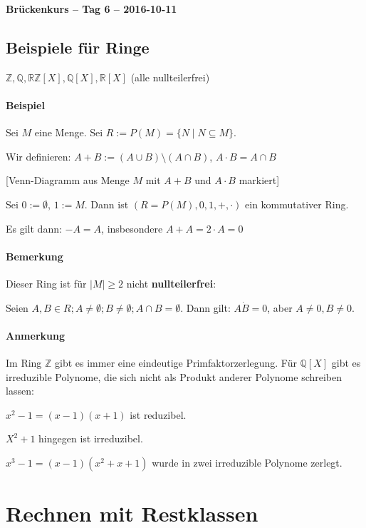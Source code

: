 \documentclass[14pt,a4paper]{article}
\newcommand{\Z}{\ensuremath{\mathbb{Z}}}
\newcommand{\Q}{\ensuremath{\mathbb{Q}}}
\begin{document}
	\begin{center}
		\Huge\textbf{Brückenkurs – Tag 6 – 2016-10-11}
	\end{center}
	\par

  \setcounter{section}{7}
  \setcounter{subsection}{3}
  \subsection{Beispiele für Ringe}
  $\Z, \Q, \mathbb{R} \Z[X], \Q[X], \mathbb{R}[X]$ (alle nullteilerfrei)

  \paragraph{Beispiel}
  Sei $M$ eine Menge. Sei $R := P(M) = \{ N \; | \; N \subseteq M\}$.

  Wir definieren: $A + B := ( A \cup B) \setminus (A \cap B)$, $A \cdot B = A
  \cap B$

  [Venn-Diagramm aus Menge $M$ mit $A+B$ und $A \cdot B$ markiert]

  Sei $ 0 := \emptyset $, $ 1 := M $.
  Dann ist $ ( R= P(M), 0, 1, +, \cdot ) $ ein kommutativer Ring.

  Es gilt dann: $ -A = A $, insbesondere $ A + A = 2 \cdot A = 0 $

  \paragraph{Bemerkung}
  Dieser Ring ist für $ |M| \geq 2 $ nicht \textbf{nullteilerfrei}:

  Seien $ A,B \in R ; A \neq \emptyset ; B \neq \emptyset ; A \cap B = \emptyset
  $.
  Dann gilt: $ A \dot B = 0$, aber $A \neq 0, B \neq 0$.

  \paragraph{Anmerkung}
  Im Ring $\Z$ gibt es immer eine eindeutige Primfaktorzerlegung.
  Für $ \Q[X] $ gibt es irreduzible Polynome, die sich nicht als Produkt anderer
  Polynome schreiben lassen:

  $ x^2 - 1 = (x-1)(x+1) $ ist reduzibel.

  $ X^2 + 1 $ hingegen ist irreduzibel.

  $ x^3 - 1 = (x-1)(x^2+x+1) $ wurde in zwei irreduzible Polynome zerlegt.

  \section{Rechnen mit Restklassen}
\end{document}

